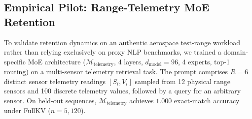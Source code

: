 \documentclass[conference]{IEEEtran}
\begin{document}
\begin{table}[t]
\centering
\caption{Range-telemetry retrieval accuracy on trained 4-layer MoE ($n=2,048$, mean [95\% bootstrap CI]).}
\label{tab:telemetry_retention}
\end{table}

\subsection{Empirical Pilot: Range-Telemetry MoE Retention}
To validate retention dynamics on an authentic aerospace test-range workload rather than relying exclusively on proxy NLP benchmarks, we trained a domain-specific MoE architecture ($\mathcal{M}_{\text{telemetry}}$, 4 layers, $d_{\text{model}}=96$, 4 experts, top-1 routing) on a multi-sensor telemetry retrieval task. The prompt comprises $R=6$ distinct sensor telemetry readings $[S_i, V_i]$ sampled from 12 physical range sensors and 100 discrete telemetry values, followed by a query for an arbitrary sensor. On held-out sequences, $\mathcal{M}_{\text{telemetry}}$ achieves $1.000$ exact-match accuracy under FullKV ($n=5,120$).
\end{document}
